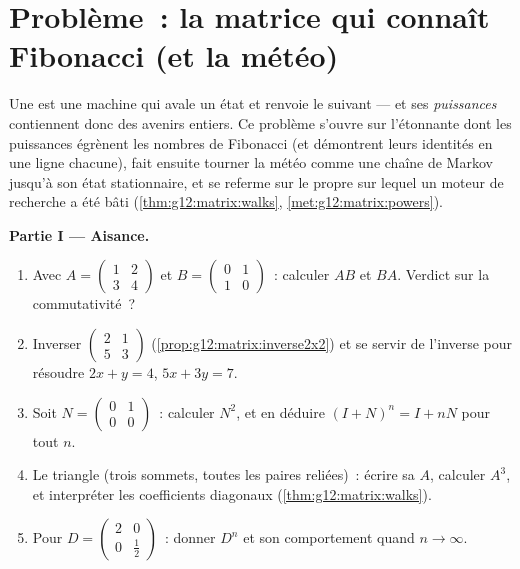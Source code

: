 \section{Problème~: la matrice qui connaît Fibonacci (et la météo)}

\begin{problem}
\label{pb:g12:matrix:1}
Une  est une machine qui avale un état et renvoie le
suivant --- et ses \emph{puissances} contiennent donc des avenirs
entiers. Ce problème s'ouvre sur l'étonnante  dont les
puissances égrènent les nombres de Fibonacci (et démontrent leurs
identités en une ligne chacune), fait ensuite tourner la météo comme
une chaîne de Markov jusqu'à son état stationnaire, et se referme
sur le  propre sur lequel un moteur de recherche a été bâti
(\cref{thm:g12:matrix:walks}, \cref{met:g12:matrix:powers}).

\medskip
\noindent\textbf{Partie I --- Aisance.}
\begin{enumerate}
  \item Avec $A = \begin{pmatrix} 1 & 2\\ 3 & 4\end{pmatrix}$ et
        $B = \begin{pmatrix} 0 & 1\\ 1 & 0\end{pmatrix}$~:
        calculer $AB$ et $BA$. Verdict sur la commutativité~?
  \item Inverser $\begin{pmatrix} 2 & 1\\ 5 & 3\end{pmatrix}$
        (\cref{prop:g12:matrix:inverse2x2}) et se servir de
        l'inverse pour résoudre $2x + y = 4$, $5x + 3y = 7$.
  \item Soit $N = \begin{pmatrix} 0 & 1\\ 0 & 0\end{pmatrix}$~:
        calculer $N^2$, et en déduire $(I + N)^n = I + nN$ pour
        tout $n$.
  \item Le  triangle (trois sommets, toutes les paires
        reliées)~: écrire sa  $A$, calculer
        $A^3$, et interpréter les coefficients diagonaux
        (\cref{thm:g12:matrix:walks}).
  \item Pour $D = \begin{pmatrix} 2 & 0\\ 0 & \frac12
        \end{pmatrix}$~: donner $D^n$ et son comportement quand
        $n \to \infty$.
\end{enumerate}


\end{problem}
